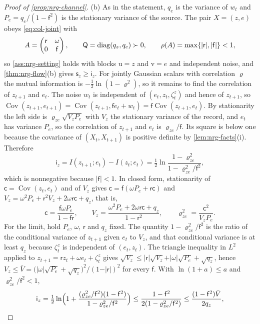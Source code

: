 \begin{proof}[Proof of \cref{prop:nrg-channel}]
(b) As in the statement, $q_e$ is the variance of $w_t$ and $P_e=q_e/(1-\mathsf f^2)$ is the stationary variance of the source. The pair $X=(z,e)$ obeys \cref{eq:col-joint} with
\[
A=\begin{pmatrix}\mathsf r&\omega\\0&\mathsf f\end{pmatrix},\qquad\mathsf Q=\operatorname{diag}(q_z,q_e)\succ0,\qquad\rho(A)=\max\{\vert\mathsf r\vert,\vert\mathsf f\vert\}<1,
\]
so \cref{ass:nrg-setting} holds with blocks $\mathrm u=z$ and $\mathrm v=e$ and independent noise, and \cref{thm:nrg-flow}(b) gives $\mathsf s_z\ge\mathsf i_z$. For jointly Gaussian scalars with correlation $\varrho$ the mutual information is $-\tfrac12\ln(1-\varrho^2)$, so it remains to find the correlation of $z_{t+1}$ and $e_t$. The noise $w_t$ is independent of $(e_t,z_t,\zeta^z_t)$ and hence of $z_{t+1}$, so $\operatorname{Cov}(z_{t+1},e_{t+1})=\operatorname{Cov}(z_{t+1},\mathsf fe_t+w_t)=\mathsf f\operatorname{Cov}(z_{t+1},e_t)$. By stationarity the left side is $\varrho_{ze}\sqrt{V_zP_e}$ with $V_z$ the stationary variance of the record, and $e_t$ has variance $P_e$, so the correlation of $z_{t+1}$ and $e_t$ is $\varrho_{ze}/\mathsf f$. Its square is below one because the covariance of $(X_t,X_{t+1})$ is positive definite by \cref{lem:nrg-facts}(i). Therefore
\[
\mathsf i_z=I(z_{t+1};e_t)-I(z_t;e_t)=\tfrac12\ln\frac{1-\varrho_{ze}^2}{1-\varrho_{ze}^2/\mathsf f^2},
\]
which is nonnegative because $\vert\mathsf f\vert<1$. In closed form, stationarity of $\mathsf c=\operatorname{Cov}(z_t,e_t)$ and of $V_z$ gives $\mathsf c=\mathsf f(\omega P_e+\mathsf r\mathsf c)$ and $V_z=\omega^2P_e+\mathsf r^2V_z+2\omega\mathsf r\mathsf c+q_z$, that is,
\[
\mathsf c=\frac{\mathsf f\omega P_e}{1-\mathsf f\mathsf r},\qquad V_z=\frac{\omega^2P_e+2\omega\mathsf r\mathsf c+q_z}{1-\mathsf r^2},\qquad\varrho_{ze}^2=\frac{\mathsf c^2}{V_zP_e}.
\]
For the limit, hold $P_e$, $\omega$, $\mathsf r$ and $q_z$ fixed. The quantity $1-\varrho_{ze}^2/\mathsf f^2$ is the ratio of the conditional variance of $z_{t+1}$ given $e_t$ to $V_z$, and that conditional variance is at least $q_z$ because $\zeta^z_t$ is independent of $(e_t,z_t)$. The triangle inequality in $L^2$ applied to $z_{t+1}=\mathsf rz_t+\omega e_t+\zeta^z_t$ gives $\sqrt{V_z}\le\vert\mathsf r\vert\sqrt{V_z}+\vert\omega\vert\sqrt{P_e}+\sqrt{q_z}$, hence $V_z\le\bar V=\bigl(\vert\omega\vert\sqrt{P_e}+\sqrt{q_z}\bigr)^2/(1-\vert\mathsf r\vert)^2$ for every $\mathsf f$. With $\ln(1+a)\le a$ and $\varrho_{ze}^2/\mathsf f^2<1$,
\[
\mathsf i_z=\tfrac12\ln\Bigl(1+\frac{(\varrho_{ze}^2/\mathsf f^2)(1-\mathsf f^2)}{1-\varrho_{ze}^2/\mathsf f^2}\Bigr)\le\frac{1-\mathsf f^2}{2(1-\varrho_{ze}^2/\mathsf f^2)}\le\frac{(1-\mathsf f^2)\bar V}{2q_z},
\]
\end{proof}
